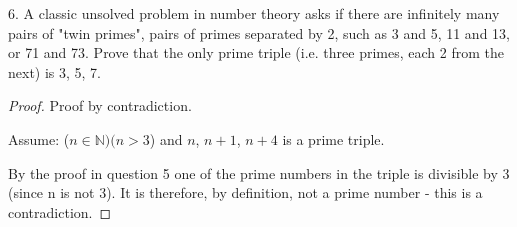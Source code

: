 \documentclass[a4paper,12pt]{article}
\begin{document}
6. A classic unsolved problem in number theory asks if there are infinitely many pairs of "twin primes", pairs of primes separated by 2, such as 3 and 5, 11 and 13, or 71 and 73. Prove that the only prime triple (i.e. three primes, each 2 from the next) is 3, 5, 7.

\begin{proof}

  Proof by contradiction.

  Assume: ($n \in \mathbb{N})(n > 3 $) and $n$, $n + 1$, $n + 4$ is a prime triple.

  By the proof in question 5 one of the prime numbers in the triple is divisible
  by 3 (since n is not 3). It is therefore, by definition, not a prime number - this is a contradiction.

\end{proof}
\end{document}
